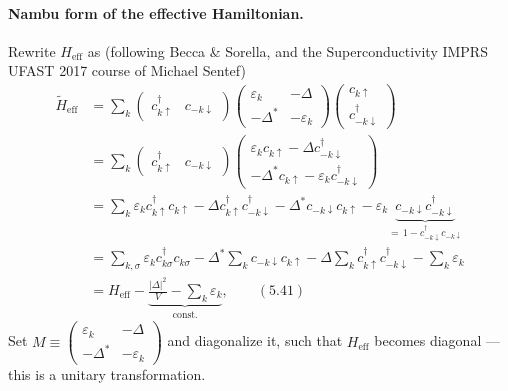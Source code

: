 \documentclass[../../main.tex]{subfiles}
\begin{document}
\paragraph{Nambu form of the effective Hamiltonian.}
Rewrite $H_{\mathrm{eff}}$ as (following Becca \& Sorella, and the Superconductivity
IMPRS UFAST 2017 course of Michael Sentef)
\begin{align}
\tilde H_{\mathrm{eff}}
&=\sum_k\begin{pmatrix}c^\dagger_{k\uparrow}&c_{-k\downarrow}\end{pmatrix}
  \begin{pmatrix}\varepsilon_k&-\Delta\\-\Delta^*&-\varepsilon_k\end{pmatrix}
  \begin{pmatrix}c_{k\uparrow}\\c^\dagger_{-k\downarrow}\end{pmatrix}\\
&=\sum_k\begin{pmatrix}c^\dagger_{k\uparrow}&c_{-k\downarrow}\end{pmatrix}
  \begin{pmatrix}\varepsilon_k c_{k\uparrow}-\Delta c^\dagger_{-k\downarrow}\\
  -\Delta^* c_{k\uparrow}-\varepsilon_k c^\dagger_{-k\downarrow}\end{pmatrix}\\
&=\sum_k\varepsilon_k c^\dagger_{k\uparrow}c_{k\uparrow}
  -\Delta c^\dagger_{k\uparrow}c^\dagger_{-k\downarrow}
  -\Delta^* c_{-k\downarrow}c_{k\uparrow}
  -\varepsilon_k \underbrace{c_{-k\downarrow}c^\dagger_{-k\downarrow}}
   _{=\,1-c^\dagger_{-k\downarrow}c_{-k\downarrow}}\\
&=\sum_{k,\sigma}\varepsilon_k c^\dagger_{k\sigma}c_{k\sigma}
  -\Delta^*\sum_k c_{-k\downarrow}c_{k\uparrow}
  -\Delta\sum_k c^\dagger_{k\uparrow}c^\dagger_{-k\downarrow}
  -\sum_k\varepsilon_k\\
&=H_{\mathrm{eff}}-\underbrace{\frac{|\Delta|^2}{V}-\sum_k\varepsilon_k}
   _{\text{const.}},\qquad (5.41)
\end{align}
Set $M\equiv\begin{pmatrix}\varepsilon_k&-\Delta\\-\Delta^*&-\varepsilon_k\end{pmatrix}$
and diagonalize it, such that $H_{\mathrm{eff}}$ becomes diagonal --- this is a unitary
transformation.
\end{document}
